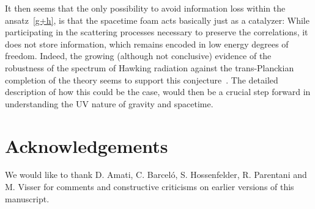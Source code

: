 \documentclass[12pt]{article}
\begin{document}
It then seems that the only possibility to avoid information loss within the ansatz~\eqref{g+h}, is that the spacetime foam acts basically just as a catalyzer: While participating in the scattering processes necessary to preserve the correlations, it does not store information, which remains encoded in low energy degrees of freedom.  Indeed, the growing (although not conclusive) evidence of the robustness of the spectrum of Hawking radiation against  the trans-Planckian completion of the theory seems to support this conjecture~\cite{Unruh:1980cg,Unruh:1994je,Brout:1995wp,Corley:1996ar,Barrabes:1998iw,Parentani:1999qv,Barrabes:2000fr,Parentani:2000ts,Parentani:2007mb,Unruh:2004zk}. The detailed description of how this could be the case, would then be a crucial step forward in understanding the UV nature of gravity and spacetime.

\section{Acknowledgements}

We would like to thank D. Amati, C. Barcel\'o, S. Hossenfelder, R. Parentani and M. Visser for comments and constructive criticisms on earlier versions of this manuscript. 
\end{document}
